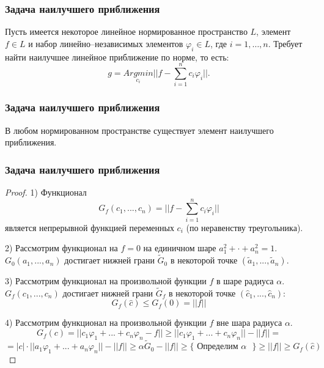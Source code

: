 \documentclass[10pt]{beamer}
\begin{document}
\begin{frame}[fragile]
\frametitle{Задача наилучшего приближения}

Пусть имеется некоторое линейное нормированное пространство $L$, элемент $f \in L$ и набор линейно--независимых элементов $\varphi_i \in L$, где $i = 1, \dots, n$. Требует найти наилучшее линейное приближение по норме, то есть:
$$g = \underset{c_i}{Argmin} ||f - \sum_{i=1}^{n} c_i \varphi_i|| .$$

\end{frame}

\begin{frame}[fragile]
\frametitle{Задача наилучшего приближения}

\begin{theorem}
В любом нормированном пространстве существует элемент наилучшего приближения.
\end{theorem}
\end{frame}

\begin{frame}[fragile]
\frametitle{Задача наилучшего приближения}

\begin{proof}
1) Функционал
$$G_f(c_1, ..., c_n) = ||f - \sum_{i=1}^{n} c_i \varphi_i||$$
является непрерывной функцией переменных $c_i$ (по неравенству треугольника).

2) Рассмотрим функционал на $f = 0$ на единичном шаре $a_1^2 + \cdot + a_n^2 = 1$. $G_0(a_1, ..., a_n)$ достигает нижней грани $\tilde{G}_0$ в некоторой точке $(\tilde{a}_1, ..., \tilde{a}_n)$.

3) Рассмотрим функционал на произвольной функции $f$ в шаре радиуса $\alpha$. $G_f(c_1, ..., c_n)$ достигает нижней грани $\tilde{G}_f$ в некоторой точке $(\hat{c}_1, ..., \hat{c}_n)$:
$$ G_f(\hat{c}) \leqslant G_f(0) = ||f|| $$

4) Рассмотрим функционал на произвольной функции $f$ вне шара радиуса $\alpha$.
$$ G_f(c) = ||c_1 \varphi_1 + ... + c_n \varphi_n - f || \geqslant ||c_1 \varphi_1 + ... + c_n \varphi_n || - || f || = $$
$$ = |c| \cdot ||a_1 \varphi_1 + ... + a_n \varphi_n || - ||f|| \geqslant \alpha \tilde{G}_0 - ||f|| \geqslant \{ \text{ Определим $\alpha$ } \} \geqslant ||f|| \geqslant G_f(\hat{c})$$
\end{proof}
\end{frame}
\end{document}
